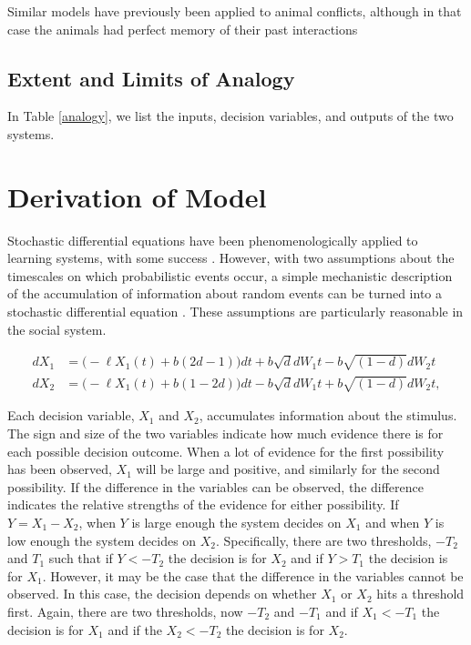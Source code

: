 \documentclass{article}
\begin{document}
Similar models have previously been applied to animal conflicts, although in that case the animals had perfect memory of their past interactions \citep{Froment:2010fk}

\subsection{Extent and Limits of Analogy }

In Table \ref{analogy}, we list the inputs, decision variables, and outputs of the two systems.  

\section{Derivation of Model \label{derivation}}
Stochastic differential equations have been phenomenologically applied to learning systems, with some success \citep{Eckhoff:2008uq, Brown:2005fk,Feng:2009kl,Bogacz:2006uq}.  However, with two assumptions about the timescales on which probabilistic events occur, a simple mechanistic description of the accumulation of information about random events can be turned into a stochastic differential equation \cite{Gillespie:2000fk}.  These assumptions are particularly reasonable in the social system.


\begin{equation}
\begin{array}{ll}
dX_1&=\bigg(-\ell X_1(t)+b(2d-1)\bigg)dt+b\sqrt{d}dW_{1}t-b\sqrt{(1-d)}dW_{2}t
\\dX_2&=\bigg(-\ell X_1(t)+b(1-2d)\bigg)dt-b\sqrt{d}dW_{1}t+b\sqrt{(1-d)}dW_{2}t,
\end{array}
\end{equation}

Each decision variable, $X_1$ and $X_2$, accumulates information about the stimulus.  The sign and size of the two variables indicate how much evidence there is for each possible decision outcome.  When a lot of evidence for the first possibility has been observed, $X_1$ will be large and positive, and similarly for the second possibility.  If the difference in the variables can be observed, the difference indicates the relative strengths of the evidence for either possibility. If $Y=X_1-X_2$, when $Y$ is large enough the system decides on $X_1$ and when $Y$ is low enough the system decides on $X_2$.  Specifically, there are two thresholds, $-T_2$ and $T_1$ such that if $Y<-T_2$ the decision is for $X_2$ and if $Y>T_1$ the decision is for $X_1$.  However, it may be the case that the difference in the variables cannot be observed.  In this case, the decision depends on whether $X_1$ or $X_2$ hits a threshold first.  Again, there are two thresholds, now $-T_2$ and $-T_1$ and if $X_1<-T_1$ the decision is for $X_1$ and if the $X_2<-T_2$ the decision is for $X_2$.  
\end{document}
